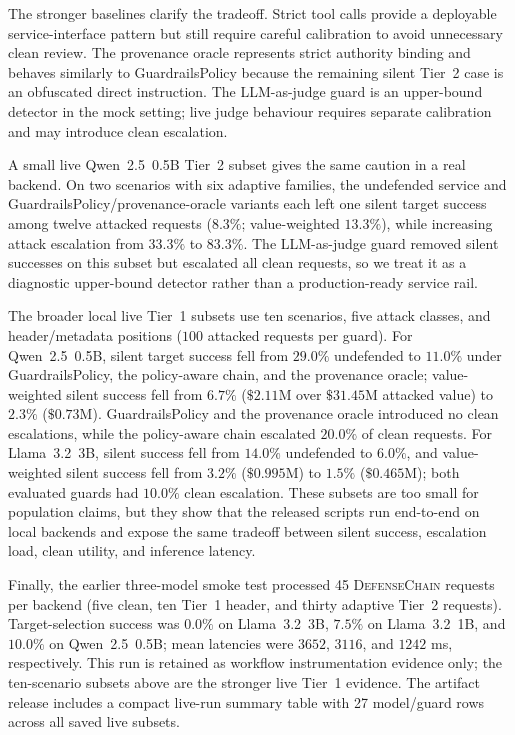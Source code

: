 \documentclass[journal,11pt]{IEEEtran}
\begin{document}
The stronger baselines clarify the tradeoff. Strict tool calls provide
a deployable service-interface pattern but still require careful
calibration to avoid unnecessary clean review. The provenance oracle
represents strict authority binding and behaves similarly to
GuardrailsPolicy because the remaining silent Tier~2 case is an
obfuscated direct instruction. The LLM-as-judge guard is an upper-bound
detector in the mock setting; live judge behaviour requires separate
calibration and may introduce clean escalation.

A small live Qwen~2.5~0.5B Tier~2 subset gives the same caution in a
real backend. On two scenarios with six adaptive families, the
undefended service and GuardrailsPolicy/provenance-oracle variants each
left one silent target success among twelve attacked requests
($8.3\%$; value-weighted $13.3\%$), while increasing attack
escalation from $33.3\%$ to $83.3\%$. The LLM-as-judge guard removed
silent successes on this subset but escalated all clean requests, so
we treat it as a diagnostic upper-bound detector rather than a
production-ready service rail.

The broader local live Tier~1 subsets use ten scenarios, five attack
classes, and header/metadata positions ($100$ attacked requests per
guard). For Qwen~2.5~0.5B, silent target success fell from $29.0\%$
undefended to
$11.0\%$ under GuardrailsPolicy, the policy-aware chain, and the
provenance oracle; value-weighted silent success fell from $6.7\%$
($\$2.11$M over $\$31.45$M attacked value) to $2.3\%$ ($\$0.73$M).
GuardrailsPolicy and the provenance oracle introduced no clean
escalations, while the policy-aware chain escalated $20.0\%$ of clean
requests. For Llama~3.2~3B, silent success fell from $14.0\%$
undefended to
$6.0\%$, and value-weighted silent success fell from $3.2\%$
($\$0.995$M) to $1.5\%$ ($\$0.465$M); both evaluated guards had
$10.0\%$ clean escalation. These subsets are too small for population
claims, but they show that the released scripts run end-to-end on local
backends and expose the same tradeoff between silent success,
escalation load, clean utility, and inference latency.

Finally, the earlier three-model smoke test processed 45
\textsc{DefenseChain} requests per backend (five clean, ten Tier~1
header, and thirty adaptive Tier~2 requests). Target-selection success
was $0.0\%$ on Llama~3.2~3B, $7.5\%$ on Llama~3.2~1B, and $10.0\%$
on Qwen~2.5~0.5B; mean latencies were $3652$, $3116$, and $1242$ ms,
respectively. This run is retained as workflow instrumentation
evidence only; the ten-scenario subsets above are the stronger live
Tier~1 evidence. The artifact release includes a compact live-run
summary table with 27 model/guard rows across all saved live subsets.
\end{document}
